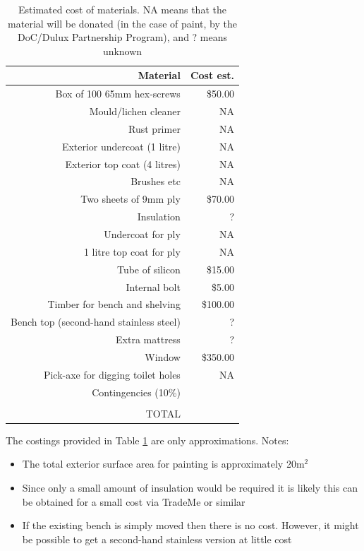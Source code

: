 \documentclass[12pt]{article} %
\begin{document}
\begin{table}[ht]
\caption{Estimated cost of materials.  NA means that the material will be donated (in the case of paint, by the DoC/Dulux Partnership Program), and ? means unknown} %
\label{costs}
\centering %
\begin{tabular}{rr}
\hline
Material & Cost est. \\ [0.5ex]
\hline %
Box of 100 65mm hex-screws & \$50.00\\
Mould/lichen cleaner & NA\\
Rust primer & NA\\
Exterior undercoat (1 litre) & NA\\
Exterior top coat (4 litres) & NA\\
Brushes etc & NA\\
Two sheets of 9mm ply & \$70.00 \\
Insulation & ?\\
Undercoat for ply & NA \\
1 litre top coat for ply & NA \\
Tube of silicon & \$15.00 \\
Internal bolt & \$5.00 \\
Timber for bench and shelving & \$100.00 \\
Bench top (second-hand stainless steel) & ?\\
Extra mattress & ?\\
Window & \$350.00 \\
Pick-axe for digging toilet holes & NA \\
Contingencies (10\%) & \\ [1ex] %
\hline \\
TOTAL & \\
\hline \hline %
\end{tabular}
\label{costs} %
\end{table}

The costings provided in Table \ref{costs} are only approximations.  Notes:

\begin{itemize}
 \item The total exterior surface area for painting is approximately 20m$^2$
 \item Since only a small amount of insulation would be required it is likely this can be obtained for a small cost via TradeMe or similar
 \item If the existing bench is simply moved then there is no cost.  However, it might be possible to get a second-hand stainless version at little cost
\end{itemize}
\end{document}
